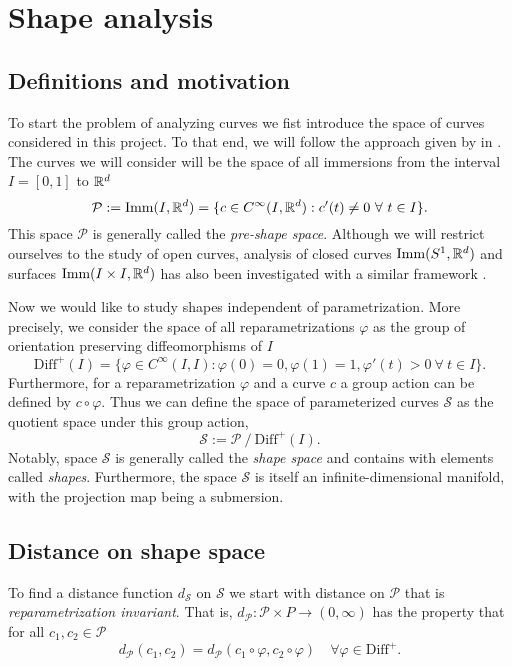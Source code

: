 \section{Shape analysis}
\subsection{Definitions and motivation}
To start the problem of analyzing curves we fist introduce the space of curves considered in this project.  To that end, we will follow the approach given by \citeauthor{bauer2015why} in \cite{bauer2015why}. The curves we will consider will be the space of all immersions from the interval  \(I = [0, 1]\) to  \(\mathbb{R}^d\)
\begin{equation}
  \mathcal{P}:= \text{Imm}(I, \mathbb{R}^d) = \{c \in C^{\infty}(I, \mathbb{R}^d) :  c'(t) \neq  0 \ \forall \ t \in I  \}.
\end{equation}
This space \(\mathcal{P}\) is generally called the \emph{pre-shape space}. Although we will restrict ourselves to the study of open curves, analysis of closed curves \(\text{Imm}(S^1, \mathbb{R}^d)\) and surfaces \(\text{Imm}(I \times I, \mathbb{R}^d)\) has also been investigated with a similar framework \cite{bauer2014overview}.

Now we would like to study shapes independent of parametrization. More precisely, we consider the space of all reparametrizations \(\varphi\) as the group of orientation preserving diffeomorphisms of \(I\)
\begin{equation}
  \text{Diff}^+(I) = \{\varphi \in C^{\infty}(I,I): \varphi(0) = 0, \varphi(1) = 1, \varphi'(t) > 0 \ \forall \ t \in I \}.
\end{equation}
Furthermore, for a reparametrization  \(\varphi \) and a curve  \(c\) a group action can be defined by  \(c \circ \varphi\). Thus we can define the space of parameterized curves \(\mathcal{S}\) as the quotient space under this group action,
\begin{equation}
  \mathcal{S} := \mathcal{P} \ / \ {\text{Diff}^+(I)}.
\end{equation}
Notably, space  \(\mathcal{S}\) is generally called the \emph{shape space} and contains with elements called \emph{shapes}. Furthermore, the space \(\mathcal{S}\) is itself an infinite-dimensional manifold, with the projection map being a submersion. 

\subsection{Distance on shape space}
To find a distance function \(d_{\mathcal{S}}\) on \(\mathcal{S}\) we start with distance on \(\mathcal{\mathcal{P}}\) that is \emph{reparametrization invariant}. That is, \(d_\mathcal{P} : \mathcal{P} \times P \rightarrow (0, \infty)\) has the property that for all  \(c_1, c_2 \in \mathcal{P}\)
\begin{equation}
  d_{\mathcal{P}}(c_1, c_2)=d_{\mathcal{P}}(c_1 \circ \varphi, c_2\circ \varphi) \quad \forall \varphi \in \text{Diff}^+.
\end{equation}

